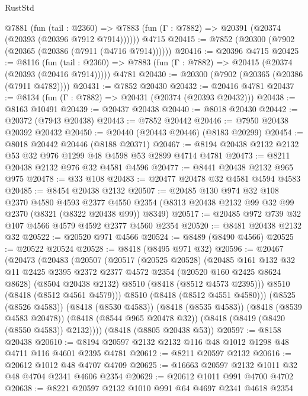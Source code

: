 \begin{lexlean}{RustStd}
\begin{coremodule}
    @7881
      (fun (tail : @2360) =>
      @7883 (fun (Γ : @7882) => @20391 (@20374 (@20393 (@20396 @7912 @7914))))))
    @4715
@20415 := @7852 (@20300 (@7902 (@20365 (@20386 (@7911 (@4716 @7914))))))
@20416 := @20396 @4715
@20425 := @8116
    (fun (tail : @2360) => @7883 (fun (Γ : @7882) => @20415 (@20374 (@20393 (@20416 @7914)))))
    @4781
@20430 := @20300 (@7902 (@20365 (@20386 (@7911 @4782))))
@20431 := @7852 @20430
@20432 := @20416 @4781
@20437 := @8134 (fun (Γ : @7882) => @20431 (@20374 (@20393 @20432)))
@20438 := @8163 @10491
@20439 := @20437 @20438
@20440 := @8018 @20430
@20442 := @20372 (@7943 @20438)
@20443 := @7852 @20442
@20446 := @7950 @20438 @20392 @20432
@20450 := @20440 (@20443 @20446) (@8183 @20299)
@20454 := @8018 @20442 @20446 (@8188 @20371)
@20467 := @8194 @20438 @2132 @2132 @53 @32 @976 @1299 @48 @4598 @53 @2899 @4714 @4781
@20473 := @8211 @20438 @2132 @976 @32 @4581 @4596
@20477 := @8441 @20438 @2132 @965 @975
@20478 := @33 @108
@20483 := @20477 @20478 @32 @4581 @4594 @4583
@20485 := @8454 @20438 @2132
@20507 := @20485
    @130
    @974
    @32
    @108
    @2370
    @4580
    @4593
    @2377
    @4550
    @2354
    (@8313 @20438 @2132 @99 @32 @99 @2370 (@8321 (@8322 @20438 @99)) @8349)
@20517 := @20485 @972 @739 @32 @107 @4566 @4579 @4592 @2377 @4560 @2354
@20520 := @8481 @20438 @2132 @32
@20522 := @20520 @971 @4566
@20524 := @8489 (@8490 @4566)
@20525 := @20522 @20524
@20528 := @8418 (@8495 @971 @32)
@20596 := @20467
    (@20473
      (@20483
        (@20507
          (@20517
            (@20525 @20528)
            (@20485
              @161
              @132
              @32
              @11
              @2425
              @2395
              @2372
              @2377
              @4572
              @2354
              (@20520 @160 @2425 @8624 @8628)
              (@8504 @20438 @2132)
              @8510
              (@8418 (@8512 @4573 @2395)))
            @8510
            (@8418 (@8512 @4561 @4579)))
          @8510
          (@8418 (@8512 @4551 @4580)))
        (@8525 (@8526 @4583))
        (@8418 (@8530 @4583))
        (@8418 (@8535 @4583))
        (@8418 (@8539 @4583 @20478))
        (@8418 (@8544 @965 @20478 @32))
        (@8418 (@8419 (@8420 (@8550 @4583)) @2132))))
    (@8418 (@8805 @20438 @53))
@20597 := @8158 @20438
@20610 := @8194 @20597 @2132 @2132 @116 @48 @1012 @1298 @48 @4711 @116 @4601 @2395 @4781
@20612 := @8211 @20597 @2132
@20616 := @20612 @1012 @48 @4707 @4709
@20625 := @16663 @20597 @2132 @1011 @32 @48 @4704 @2341 @4606 @2354
@20629 := @20612 @1011 @991 @4700 @4702
@20638 := @8221 @20597 @2132 @1010 @991 @64 @4697 @2341 @4618 @2354

\end{coremodule}
\end{lexlean}
